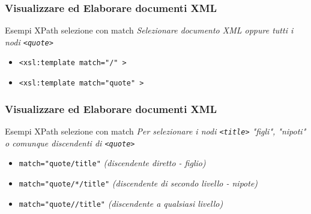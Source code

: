 \begin{frame}
    \frametitle{Visualizzare ed Elaborare documenti XML}
    \addtocounter{nframe}{1}
    

    \begin{block}{Esempi XPath selezione con match}
        \emph{Selezionare \textit{documento XML} oppure tutti i nodi \texttt{<quote>}}
        \begin{itemize}
            \item \texttt{<xsl:template match="/" >}
            \item \texttt{<xsl:template match="quote" >}
        \end{itemize}
        
    \end{block}
     
\end{frame}

\begin{frame}
    \frametitle{Visualizzare ed Elaborare documenti XML}
    \addtocounter{nframe}{1}
    
 
    \begin{block}{Esempi XPath selezione con match}
        \emph{Per selezionare i nodi \texttt{<title>} "figli", "nipoti" o comunque discendenti di \texttt{<quote>}}
        \begin{itemize}
            \item \texttt{match="quote/title"} \textit{(discendente diretto - figlio)}
            \item \texttt{match="quote/*/title"} \textit{(discendente di secondo livello - nipote)}
            \item \texttt{match="quote//title"} \textit{(discendente a qualsiasi livello)}
        \end{itemize}     
    \end{block}
    
\end{frame}

